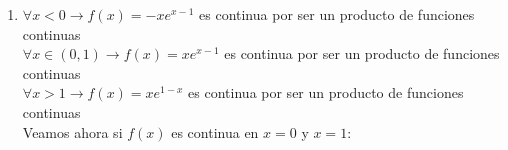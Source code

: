 \begin{enumerate}[label=\color{red}\textbf{\arabic*)}, leftmargin=*]
Como es un cociente, debemos evitar que el denominador sea cero: \begin{center}
	$1-e^x=0\longrightarrow e^x=1\longrightarrow x=\ln(1)=0\longrightarrow\bboxed{x=0}$ No pertenece el dominio
\end{center}
Como hay una raíz cuadrada, lo de dentro no puede ser negativo: \[ 1-e^x>0\longrightarrow e^x<1\longrightarrow x<\ln(1)=0\longrightarrow\bboxed{x<0} \]
\item {}
$\forall x<0\longrightarrow f(x)=-xe^{x-1}$ es continua por ser un producto de funciones continuas\\
$\forall x\in(0,1)\longrightarrow f(x)=xe^{x-1}$ es continua por ser un producto de funciones continuas\\
$\forall x>1\longrightarrow f(x)=xe^{1-x}$ es continua por ser un producto de funciones continuas\\
Veamos ahora si $f(x)$ es continua en $x=0$ y $x=1$:
\end{enumerate}
